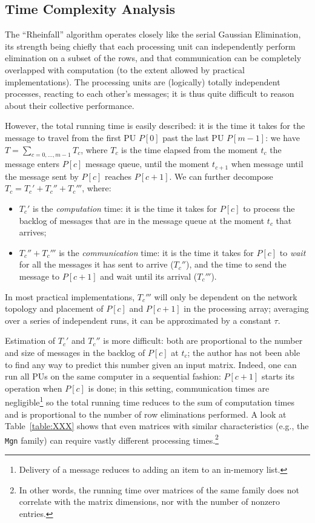 \subsection{Time Complexity Analysis}
\label{sec:complexity}

The ``Rheinfall'' algorithm operates closely like the serial Gaussian
Elimination, its strength being chiefly that each processing unit can
independently perform elimination on a subset of the rows, and that
communication can be completely overlapped with computation (to the
extent allowed by practical implementations).
The processing units are (logically) totally independent processes,
reacting to each other's messages; it is thus quite difficult to
reason about their collective performance.  

However, the total running time is easily described: it is the time it
takes for the  message to travel from the first PU $P[0]$ past
the last PU $P[m-1]$: we have $T = \sum_{c=0, \ldots, m-1} T_c$, where
$T_c$ is the time elapsed from the moment $t_c$ the  message
enters $P[c]$ message queue, until the moment $t_{c+1}$ when 
message until the  message sent by $P[c]$ reaches $P[c+1]$.
We can further decompose $T_c = T_c' + T_c'' + T_c'''$, where:
\begin{itemize}
\item $T_c'$ is the \emph{computation} time: it is the time it takes
  for $P[c]$ to process the backlog of  messages that are in
  the message queue at the moment $t_c$ that  arrives;
\item $T_c'' + T_c'''$ is the \emph{communication} time: it is the
  time it takes for $P[c]$ to \emph{wait} for all the 
  messages it has sent to arrive ($T_c''$), and the time to send the
   message to $P[c+1]$ and wait until its arrival ($T_c'''$).
\end{itemize}
In most practical implementations, $T_c'''$ will only be dependent on
the network topology and placement of $P[c]$ and $P[c+1]$ in the
processing array; averaging over a series of independent runs, it can
be approximated by a constant $\tau$.  

Estimation of $T_c'$ and $T_c''$ is more difficult: both are
proportional to the number and size of  messages in the
backlog of $P[c]$ at $t_c$; the author has not been able to find any
way to predict this number given an input matrix.  Indeed, one can run
all PUs on the same computer in a sequential fashion: $P[c+1]$ starts
its operation when $P[c]$ is done; in this setting, communication
times are negligible\footnote{Delivery of a message reduces to adding
  an item to an in-memory list.} so the total running time reduces to
the sum of computation times and is proportional to the number of row
eliminations performed.  A look at Table~\ref{table:XXX} shows that
even matrices with similar characteristics (e.g., the \texttt{Mgn}
family) can require vastly different processing times.\footnote{In
  other words, the running time over matrices of the same family does
  not correlate with the matrix dimensions, nor with the number of
  nonzero entries.}

